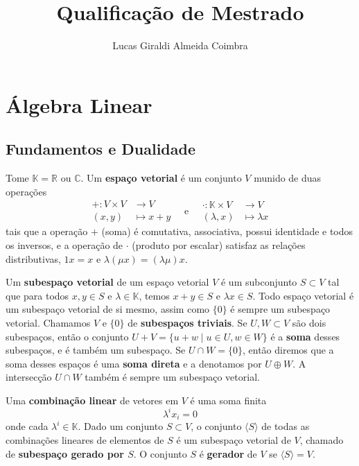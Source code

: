 \documentclass{article}
\title{Qualificação de Mestrado}
\author{Lucas Giraldi Almeida Coimbra}
\begin{document}
\maketitle
\tableofcontents

\section{Álgebra Linear}

\subsection{Fundamentos e Dualidade}

Tome $\mathbb{K} = \mathbb{R}$ ou $\mathbb{C}$. Um \textbf{espaço vetorial} é um conjunto $V$ munido de duas operações \begin{equation}
    \begin{split}
        + \colon V \times V &\to V \\ (x,y) &\mapsto x + y
    \end{split} \quad \text{e} \quad \begin{split}
        \cdot \colon \mathbb{K} \times V &\to V \\ (\lambda,x) &\mapsto \lambda x
    \end{split}
\end{equation} tais que a operação $+$ (soma) é comutativa, associativa, possui identidade e todos os inversos, e a operação de $\cdot$ (produto por escalar) satisfaz as relações distributivas, $1x = x$ e $\lambda(\mu x) = (\lambda\mu)x$.

Um \textbf{subespaço vetorial} de um espaço vetorial $V$ é um subconjunto $S \subset V$ tal que para todos $x, y \in S$ e $\lambda \in \mathbb{K}$, temos $x + y \in S$ e $\lambda x \in S$. Todo espaço vetorial é um subespaço vetorial de si mesmo, assim como $\{0\}$ é sempre um subespaço vetorial. Chamamos $V$ e $\{0\}$ de \textbf{subespaços triviais}. Se $U, W \subset V$ são dois subespaços, então o conjunto $U + V = \{u + w \mid u \in U, w \in W\}$ é a \textbf{soma} desses subespaços, e é também um subespaço. Se $U \cap W = \{0\}$, então diremos que a soma desses espaços é uma \textbf{soma direta} e a denotamos por $U \oplus W$. A intersecção $U \cap W$ também é sempre um subespaço vetorial.

Uma \textbf{combinação linear} de vetores em $V$ é uma soma finita \begin{equation}
    \lambda^i x_i = 0
\end{equation} onde cada $\lambda^i \in \mathbb{K}$. Dado um conjunto $S \subset V$, o conjunto $\langle S \rangle$ de todas as combinações lineares de elementos de $S$ é um subespaço vetorial de $V$, chamado de \textbf{subespaço gerado por $S$}. O conjunto $S$ é \textbf{gerador} de $V$ se $\langle S \rangle = V$.
\end{document}
